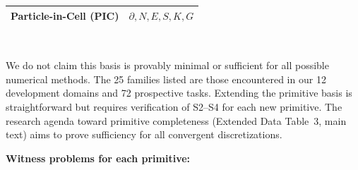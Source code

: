 \documentclass[11pt,a4paper]{article}
\begin{document}
\begin{table}[htbp]
\begin{tabularx}{\textwidth}{lX}
Particle-in-Cell (PIC) & $\partial, N, E, S, K, G$ \\
\bottomrule
\end{tabularx}\\[3pt]
\raggedright\scriptsize We do not claim this basis is provably minimal or sufficient for all possible numerical methods. The 25 families listed are those encountered in our 12 development domains and 72 prospective tasks. Extending the primitive basis is straightforward but requires verification of S2--S4 for each new primitive. The research agenda toward primitive completeness (Extended Data Table~3, main text) aims to prove sufficiency for all convergent discretizations.
\end{table}

\textbf{Witness problems for each primitive:}
\end{document}
